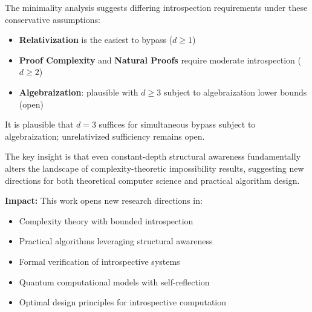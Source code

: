 \documentclass[11pt]{article}
\theoremstyle{plain}
\theoremstyle{definition}
\begin{document}
The minimality analysis suggests differing introspection requirements under these conservative assumptions:
\begin{itemize}
\item \textbf{Relativization} is the easiest to bypass ($d \geq 1$)
\item \textbf{Proof Complexity} and \textbf{Natural Proofs} require moderate introspection ($d \geq 2$)
\item \textbf{Algebraization}: plausible with $d \geq 3$ subject to algebraization lower bounds (open)
\end{itemize}

It is plausible that $d=3$ suffices for simultaneous bypass subject to algebraization; unrelativized sufficiency remains open.

The key insight is that even constant-depth structural awareness fundamentally alters the landscape of complexity-theoretic impossibility results, suggesting new directions for both theoretical computer science and practical algorithm design.

\textbf{Impact:} This work opens new research directions in:
\begin{itemize}
\item Complexity theory with bounded introspection
\item Practical algorithms leveraging structural awareness
\item Formal verification of introspective systems
\item Quantum computational models with self-reflection
\item Optimal design principles for introspective computation
\end{itemize}

\nocite{*}


\end{document}
